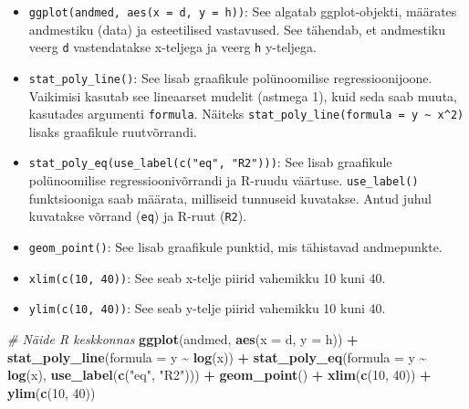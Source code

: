 \documentclass[
]{book}
\newenvironment{Shaded}{\begin{snugshade}}{\end{snugshade}}
\newcommand{\AttributeTok}[1]{\textcolor[rgb]{0.13,0.29,0.53}{#1}}
\newcommand{\CommentTok}[1]{\textcolor[rgb]{0.56,0.35,0.01}{\textit{#1}}}
\newcommand{\DecValTok}[1]{\textcolor[rgb]{0.00,0.00,0.81}{#1}}
\newcommand{\FunctionTok}[1]{\textcolor[rgb]{0.13,0.29,0.53}{\textbf{#1}}}
\newcommand{\NormalTok}[1]{#1}
\newcommand{\SpecialCharTok}[1]{\textcolor[rgb]{0.81,0.36,0.00}{\textbf{#1}}}
\newcommand{\StringTok}[1]{\textcolor[rgb]{0.31,0.60,0.02}{#1}}
\renewenvironment{Shaded} {\begin{snugshade}\footnotesize} {\end{snugshade}}
\begin{document}
\begin{itemize}
\item
  \texttt{ggplot(andmed,\ aes(x\ =\ d,\ y\ =\ h))}: See algatab ggplot-objekti, määrates andmestiku (data) ja esteetilised vastavused. See tähendab, et andmestiku veerg \texttt{d} vastendatakse x-teljega ja veerg \texttt{h} y-teljega.
\item
  \texttt{stat\_poly\_line()}: See lisab graafikule polünoomilise regressioonijoone. Vaikimisi kasutab see lineaarset mudelit (astmega 1), kuid seda saab muuta, kasutades argumenti \texttt{formula}. Näiteks \texttt{stat\_poly\_line(formula\ =\ y\ \textasciitilde{}\ x\^{}2)} lisaks graafikule ruutvõrrandi.
\item
  \texttt{stat\_poly\_eq(use\_label(c("eq",\ "R2")))}: See lisab graafikule polünoomilise regressioonivõrrandi ja R-ruudu väärtuse. \texttt{use\_label()} funktsiooniga saab määrata, milliseid tunnuseid kuvatakse. Antud juhul kuvatakse võrrand (\texttt{eq}) ja R-ruut (\texttt{R2}).
\item
  \texttt{geom\_point()}: See lisab graafikule punktid, mis tähistavad andmepunkte.
\item
  \texttt{xlim(c(10,\ 40))}: See seab x-telje piirid vahemikku 10 kuni 40.
\item
  \texttt{ylim(c(10,\ 40))}: See seab y-telje piirid vahemikku 10 kuni 40.
\end{itemize}

\begin{Shaded}
\begin{Highlighting}[]
\CommentTok{\# Näide R keskkonnas}
\FunctionTok{ggplot}\NormalTok{(andmed, }\FunctionTok{aes}\NormalTok{(}\AttributeTok{x =}\NormalTok{ d, }\AttributeTok{y =}\NormalTok{ h)) }\SpecialCharTok{+}
  \FunctionTok{stat\_poly\_line}\NormalTok{(}\AttributeTok{formula =}\NormalTok{ y }\SpecialCharTok{\textasciitilde{}} \FunctionTok{log}\NormalTok{(x)) }\SpecialCharTok{+}
  \FunctionTok{stat\_poly\_eq}\NormalTok{(}\AttributeTok{formula =}\NormalTok{ y }\SpecialCharTok{\textasciitilde{}} \FunctionTok{log}\NormalTok{(x), }\FunctionTok{use\_label}\NormalTok{(}\FunctionTok{c}\NormalTok{(}\StringTok{"eq"}\NormalTok{, }\StringTok{"R2"}\NormalTok{))) }\SpecialCharTok{+}
  \FunctionTok{geom\_point}\NormalTok{() }\SpecialCharTok{+}
  \FunctionTok{xlim}\NormalTok{(}\FunctionTok{c}\NormalTok{(}\DecValTok{10}\NormalTok{, }\DecValTok{40}\NormalTok{)) }\SpecialCharTok{+} \FunctionTok{ylim}\NormalTok{(}\FunctionTok{c}\NormalTok{(}\DecValTok{10}\NormalTok{, }\DecValTok{40}\NormalTok{))}
\end{Highlighting}
\end{Shaded}
\end{document}

